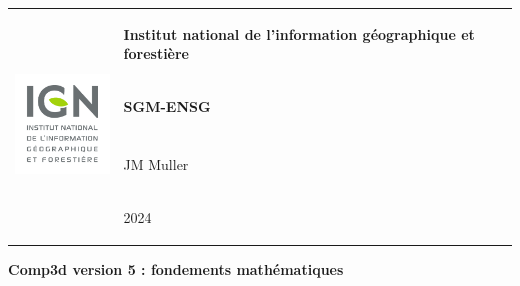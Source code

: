 \documentclass[french]{report}
\begin{document}
\renewcommand{\labelitemi}{$\bullet$}

	\begin{tabular*}{\textwidth}{l p{10cm} l}
		\multirow{8}{*}{\includegraphics[width=3cm]{images/logo_ign}} & \centering \begin{small} \textbf{{Institut national de l'information géographique et forestière}} \end{small} & \\

																																			 & \centering \begin{small}\textbf{SGM-ENSG}\end{small}& \\
                                                                       & &\\ \cline{2-3}

																																			& \centering \begin{small}JM Muller \end{small} &\\
																																			&	\centering \begin{small}2024 \end{small}&

	\end{tabular*}

\vspace{1.5cm}

\begin{framed}
	\centering
		\vspace{0.5cm}

		\textbf{\LARGE{Comp3d version 5 : fondements mathématiques}}

		\vspace{0.5cm}
\end{framed}




\newpage
\end{document}

